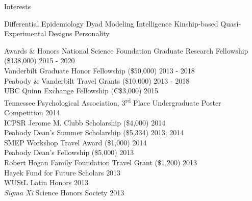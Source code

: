 \documentclass {resume}
\newcommand{\bigcdot}{\hspace* {-.8 mm}{\Large$\cdot$}\hspace* {.8 mm}}
\begin{document}
\begin{rSection}{\textrm{Interests}} \begin{center}Differential Epidemiology \bigcdot Dyad Modeling \bigcdot Intelligence \bigcdot Kinship-based Quasi-Experimental Designs \bigcdot Personality\end{center}
\end{rSection}
\begin{rSection}{\textrm{Awards \& Honors}}
National Science Foundation Graduate Research Fellowship (\$138,000) \hfill{2015 - 2020}\smallskip\\
Vanderbilt Graduate Honor Fellowship (\$50,000)	\hfill  {2013 - 2018}\smallskip\\	
Peabody \& Vanderbilt Travel Grants (\$10,000)      \hfill  {2013 - 2018}\smallskip\\
UBC Quinn Exchange Fellowship (C\$3,000) \hfill{2015}\smallskip\\
Tennessee Psychological Association, 3\textsuperscript{rd} Place Undergraduate Poster Competition \hfill{2014}\smallskip\\
ICPSR Jerome M. Clubb Scholarship (\$4,000) \hfill{2014}\smallskip\\
Peabody Dean's Summer Scholarship (\$5,334)			    \hfill  {2013; 2014}\smallskip\\	
SMEP Workshop Travel Award (\$1,000) \hfill{2014}\smallskip\\
Peabody Dean's Fellowship (\$5,000)					\hfill  {2013}\smallskip\\
Robert Hogan Family Foundation Travel Grant (\$1,200) 	\hfill  {2013}\smallskip\\
Hayek Fund for Future Scholars                      \hfill  {2013}\smallskip\\
WUStL Latin Honors \hfill  {2013}\smallskip\\
\textit{Sigma Xi} Science Honors Society                    			\hfill  {2013}%
\end{rSection}
\end{document}
